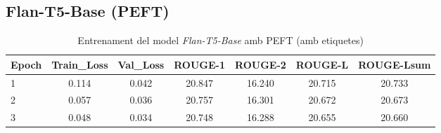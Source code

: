 \subsection{Flan-T5-Base (PEFT)}
\begin{table}[H]
    \centering
    \label{tab:additional-training}
    \begin{tabular}{lcccccc}
    \toprule
    Epoch & Train\_Loss & Val\_Loss & ROUGE-1 & ROUGE-2 & ROUGE-L & ROUGE-Lsum \\
    \midrule
    1 & 0.114 & 0.042 & 20.847 & 16.240 & 20.715 & 20.733 \\
    2 & 0.057 & 0.036 & 20.757 & 16.301 & 20.672 & 20.673 \\
    3 & 0.048 & 0.034 & 20.748 & 16.288 & 20.655 & 20.660 \\
    \bottomrule
    \end{tabular}
    \caption[Entrenament del model \textit{Flan-T5-Base} amb PEFT]{Entrenament del model \textit{Flan-T5-Base} amb PEFT (amb etiquetes)}
\end{table}
